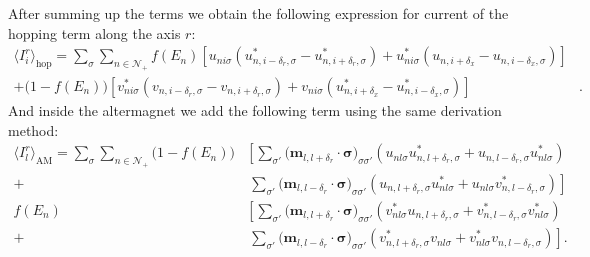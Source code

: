 \documentclass[../main.tex]{subfile}
\begin{document}
After summing up the terms we obtain the following expression for current of the hopping term along the axis $r$:
\begin{equation}
    \begin{aligned}
        \langle I_i^r\rangle_{\text{hop}} = \sum_{\sigma}\sum_{n\in\mathcal{N}_+} 
            f(E_n)\left[u_{ni\sigma}\left(u_{n,i-\delta_r,\sigma}^{\ast} - u_{n,i+\delta_r,\sigma}^{\ast}\right) + u_{ni\sigma}^{\ast}\left(u_{n,i+\delta_x} - u_{n,i-\delta_x,\sigma}\right)\right]&\\
            +\bigl(1-f(E_n)\bigr)\left[v_{ni\sigma}^{\ast}\left(v_{n,i-\delta_r,\sigma} - v_{n,i+\delta_r,\sigma}\right) + v_{ni\sigma}\left(u_{n,i+\delta_x}^{\ast} - u_{n,i-\delta_x,\sigma}^{\ast}\right)\right]&.
    \end{aligned}
\end{equation}
And inside the altermagnet we add the following term using the same derivation method:
\begin{equation*}
    \begin{aligned}
    \langle I_l^r\rangle_{\text{AM}} = \sum_{\sigma}\sum_{n\in\mathcal{N}_+} \bigl(1-f(E_n)) 
    &\left[ \sum _{\sigma'}\bigl(\bm{m}_{l,l+\delta_r}\cdot\bm{\sigma}\bigr)_{\sigma\sigma'} \left(u_{nl\sigma} u_{n,l+\delta_r,\sigma}^{\ast}  + u_{n,l-\delta_r,\sigma}u_{nl\sigma}^{\ast}\right)\right.\\
    +&~\left.\sum _{\sigma'}\bigl(\bm{m}_{l,l-\delta_r}\cdot\bm{\sigma}\bigr)_{\sigma\sigma'} \left(u_{n,l+\delta_r,\sigma} u_{nl\sigma}^{\ast} + u_{nl\sigma}v_{n,l-\delta_r,\sigma}^{\ast}\right)\right]\\
    f(E_n)&\left[ \sum _{\sigma'}\bigl(\bm{m}_{l,l+\delta_r}\cdot\bm{\sigma}\bigr)_{\sigma\sigma'} \left(v_{nl\sigma}^{\ast} u_{n,l+\delta_r,\sigma}  + v_{n,l-\delta_r,\sigma}^{\ast}v_{nl\sigma}^{\ast}\right)\right.\\
    +&~\left.\sum _{\sigma'}\bigl(\bm{m}_{l,l-\delta_r}\cdot\bm{\sigma}\bigr)_{\sigma\sigma'} \left(v_{n,l+\delta_r,\sigma}^{\ast} v_{nl\sigma} + v_{nl\sigma}^{\ast}v_{n,l-\delta_r,\sigma}\right)\right].
    \end{aligned}
\end{equation*}
\end{document}
